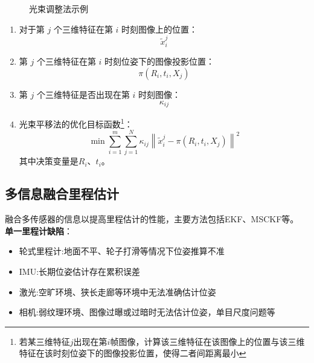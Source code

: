 \documentclass[../main.tex]{subfiles}
\begin{document}
\begin{enumerate}
\begin{itemize}
\begin{enumerate}
\begin{itemize}
\begin{itemize}
\begin{itemize}
\begin{figure}[H]
                                            \caption{光束调整法示例}
                                        \end{figure}
                                        \begin{small}\kaishu
                                        \begin{enumerate}
                                            \item 对于第 $j$ 个三维特征在第 $i$ 时刻图像上的位置：
                                            \[
                                            \tilde{x}_i^j
                                            \]
                                            \item 第 $j$ 个三维特征在第 $i$ 时刻位姿下的图像投影位置：
                                            \[
                                            \pi(R_i, t_i, X_j)
                                            \]
                                            \item 第 $j$ 个三维特征是否出现在第 $i$ 时刻图像：
                                            \[
                                            \kappa_{ij}
                                            \]
                                            \item 光束平移法的优化目标函数\footnote{若某三维特征$j$出现在第$i$帧图像，计算该三维特征在该图像上的位置与该三维特征在该时刻位姿下的图像投影位置，使得二者间距离最小}：
                                            \[
                                            \min \sum_{i=1}^{m} \sum_{j=1}^{N} \kappa_{ij} \left\| \tilde{x}_i^j - \pi(R_i, t_i, X_j) \right\|^2
                                            \]
                                            其中决策变量是$R_i$、$t_i$。
                                        \end{enumerate}
                                        \end{small}
                                    \end{itemize}


                        \end{itemize}
                        \end{itemize}
                \end{enumerate}
        \end{itemize}
\end{enumerate}
\subsection{多信息融合里程估计}
融合多传感器的信息以提高里程估计的性能，主要方法包括EKF、MSCKF等。
\textbf{单一里程计缺陷}：
\begin{itemize}
    \item 轮式里程计:地面不平、轮子打滑等情况下位姿推算不准
    \item IMU:长期位姿估计存在累积误差
    \item 激光:空旷环境、狭长走廊等环境中无法准确估计位姿
    \item 相机:弱纹理环境、图像过曝或过暗时无法估计位姿，单目尺度问题等
\end{itemize}
\end{document}
